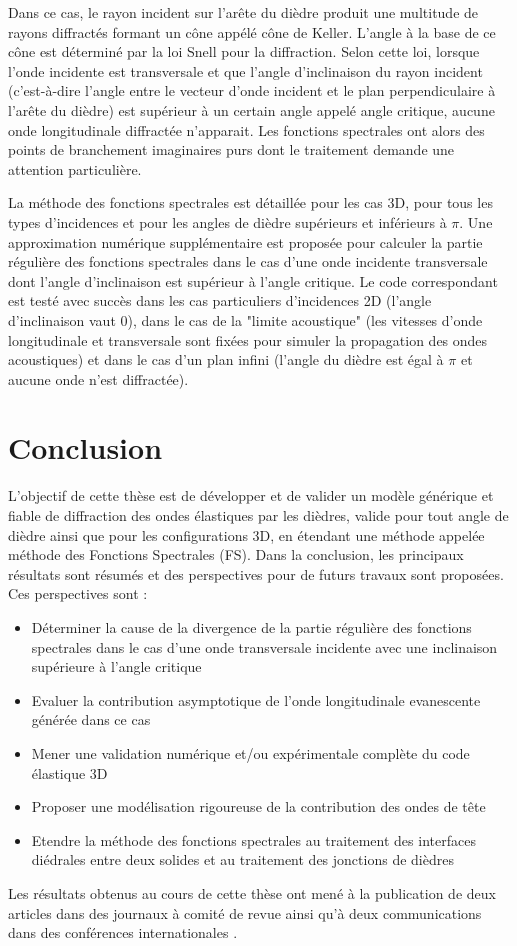 Dans ce cas, le rayon incident sur l'arête du dièdre produit une multitude de rayons diffractés formant un cône appélé cône de Keller. L'angle à la base de ce cône est déterminé par la loi Snell pour la diffraction. Selon cette loi, lorsque l'onde incidente est transversale et que l'angle d'inclinaison du rayon incident (c'est-à-dire l'angle entre le vecteur d'onde incident et le plan perpendiculaire à l'arête du dièdre) est supérieur à un certain angle appelé angle critique, aucune onde longitudinale diffractée n'apparait. Les fonctions spectrales ont alors des points de branchement imaginaires purs dont le traitement demande une attention particulière. 

La méthode des fonctions spectrales est détaillée pour les cas 3D, pour tous les types d'incidences et pour les angles de dièdre supérieurs et inférieurs à $\pi$. Une approximation numérique supplémentaire est proposée pour calculer la partie régulière des fonctions spectrales dans le cas d'une onde incidente transversale dont l'angle d'inclinaison est supérieur à l'angle critique. Le code correspondant est testé avec succès dans les cas particuliers d'incidences 2D (l'angle d'inclinaison vaut $0$), dans le cas de la "limite acoustique" (les vitesses d'onde longitudinale et transversale sont fixées pour simuler la propagation des ondes acoustiques) et dans le cas d'un plan infini (l'angle du dièdre est égal à $\pi$ et aucune onde n'est diffractée).

\section[Conclusion]{Conclusion}

L'objectif de cette thèse est de développer et de valider un modèle générique et fiable de diffraction des ondes élastiques par les dièdres, valide pour tout angle de dièdre ainsi que pour les configurations 3D, en étendant une méthode appelée méthode des Fonctions Spectrales (FS). Dans la conclusion, les principaux résultats sont résumés et des perspectives pour de futurs travaux sont proposées. Ces perspectives sont :
\begin{itemize}
\item Déterminer la cause de la divergence de la partie régulière des fonctions spectrales dans le cas d'une onde transversale incidente avec une inclinaison supérieure à l'angle critique
\item Evaluer la contribution asymptotique de l'onde longitudinale evanescente générée dans ce cas
\item Mener une validation numérique et/ou expérimentale complète du code élastique 3D
\item Proposer une modélisation rigoureuse de la contribution des ondes de tête
\item Etendre la méthode des fonctions spectrales au traitement des interfaces diédrales entre deux solides et au traitement des jonctions de dièdres
\end{itemize}


Les résultats obtenus au cours de cette thèse ont mené à la publication de deux articles dans des journaux à comité de revue \cite{article, articleelasto} ainsi qu'à deux communications dans des conférences internationales \cite{DD2018,AFPAC}.